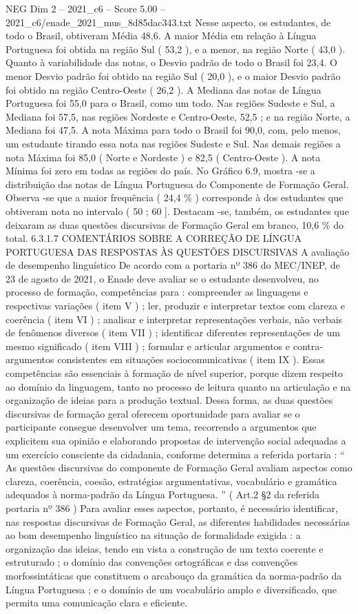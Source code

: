 \begin{textsample}{NEG Dim 2 – 2021\_c6 – Score 5.00 – 2021\_c6/enade\_2021\_mus\_8d85dac343.txt}
Nesse aspecto, os estudantes, de todo o Brasil, obtiveram Média 48,6.
A maior Média em relação à Língua Portuguesa foi obtida na região Sul ( 53,2 ), e a menor, na região Norte ( 43,0 ).
Quanto à variabilidade das notas, o Desvio padrão de todo o Brasil foi 23,4.
O menor Desvio padrão foi obtido na região Sul ( 20,0 ), e o maior Desvio padrão foi obtido na região Centro-Oeste ( 26,2 ).
A Mediana das notas de Língua Portuguesa foi 55,0 para o Brasil, como um todo.
Nas regiões Sudeste e Sul, a Mediana foi 57,5, nas regiões Nordeste e Centro-Oeste, 52,5 ; e na região Norte, a Mediana foi 47,5.
A nota Máxima para todo o Brasil foi 90,0, com, pelo menos, um estudante tirando essa nota nas regiões Sudeste e Sul.
Nas demais regiões a nota Máxima foi 85,0 ( Norte e Nordeste ) e 82,5 ( Centro-Oeste ).
A nota Mínima foi zero em todas as regiões do país.
No Gráfico 6.9, mostra -se a distribuição das notas de Língua Portuguesa do Componente de Formação Geral.
Observa -se que a maior frequência ( 24,4 \% ) corresponde à dos estudantes que obtiveram nota no intervalo ( 50 ; 60 ].
Destacam -se, também, os estudantes que deixaram as duas questões discursivas de Formação Geral em branco, 10,6 \% do total. 6.3.1.7 COMENTÁRIOS SOBRE A CORREÇÃO DE LÍNGUA PORTUGUESA DAS RESPOSTAS ÀS QUESTÕES DISCURSIVAS A avaliação de desempenho linguístico De acordo com a portaria nº 386 do MEC/INEP, de 23 de agosto de 2021, o Enade deve avaliar se o estudante desenvolveu, no processo de formação, competências para : compreender as linguagens e respectivas variações ( item V ) ; ler, produzir e interpretar textos com clareza e coerência ( item VI ) ; analisar e interpretar representações verbais, não verbais de fenômenos diversos ( item VII ) ; identificar diferentes representações de um mesmo significado ( item VIII ) ; formular e articular argumentos e contra-argumentos consistentes em situações sociocomunicativas ( item IX ).
Essas competências são essenciais à formação de nível superior, porque dizem respeito ao domínio da linguagem, tanto no processo de leitura quanto na articulação e na organização de ideias para a produção textual.
Dessa forma, as duas questões discursivas de formação geral oferecem oportunidade para avaliar se o participante consegue desenvolver um tema, recorrendo a argumentos que explicitem sua opinião e elaborando propostas de intervenção social adequadas a um exercício consciente da cidadania, conforme determina a referida portaria : “ As questões discursivas do componente de Formação Geral avaliam aspectos como clareza, coerência, coesão, estratégias argumentativas, vocabulário e gramática adequados à norma-padrão da Língua Portuguesa. ” ( Art.2 §2 da referida portaria nº 386 ) Para avaliar esses aspectos, portanto, é necessário identificar, nas respostas discursivas de Formação Geral, as diferentes habilidades necessárias ao bom desempenho linguístico na situação de formalidade exigida : a organização das ideias, tendo em vista a construção de um texto coerente e estruturado ; o domínio das convenções ortográficas e das convenções morfossintáticas que constituem o arcabouço da gramática da norma-padrão da Língua Portuguesa ; e o domínio de um vocabulário amplo e diversificado, que permita uma comunicação clara e eficiente.

\end{textsample}
